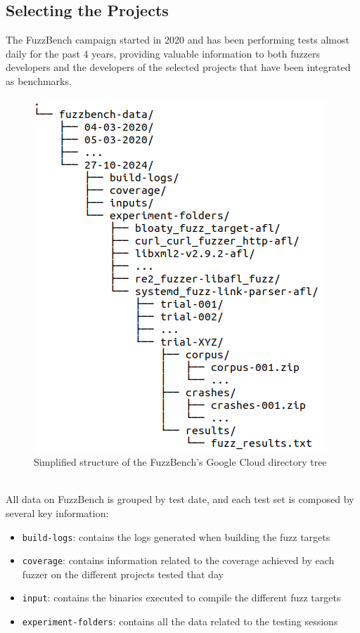 \subsection{Selecting the Projects}
The FuzzBench campaign started in 2020 and has been performing tests almost daily for the past 4 years, providing valuable information to both fuzzers developers and the developers of the selected projects that have been integrated as benchmarks.
\begin{figure}[h]
\centering
\includegraphics[scale=0.4]{foto/tree.png}
\caption{Simplified structure of the FuzzBench's Google Cloud directory tree}
\label{fig:tree}
\end{figure}
\ \\
All data on FuzzBench is grouped by test date, and each test set is composed by several key information:
\begin{itemize}
    \item \verb|build-logs|: contains the logs generated when building the fuzz targets
    \item \verb|coverage|: contains information related to the coverage achieved by each fuzzer on the different projects tested that day
    \item \verb|input|: contains the binaries executed to compile the different fuzz targets
    \item \verb|experiment-folders|: contains all the data related to the testing sessions
\end{itemize}


